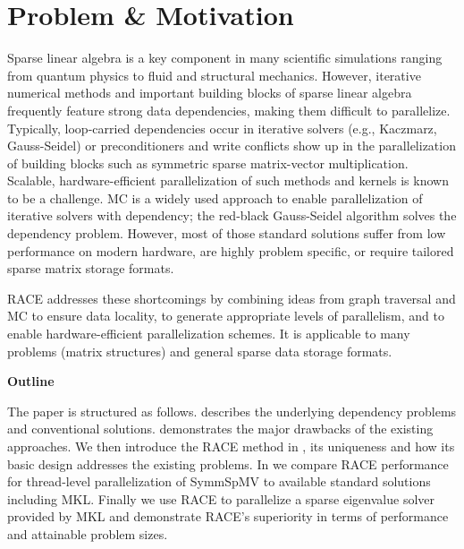 	
\section{Problem \& Motivation}
	Sparse linear algebra is a key component in many scientific simulations
	ranging from quantum physics to fluid and structural mechanics.
	However, iterative numerical methods  
	and important building blocks of sparse linear algebra frequently feature strong 
	data dependencies, making them difficult to parallelize.
	Typically, loop-carried dependencies occur in
	iterative solvers  (e.g., Kaczmarz, Gauss-Seidel) or preconditioners 
	and write conflicts show up in the parallelization of building blocks such 
	as symmetric sparse matrix-vector multiplication.
	Scalable, hardware-efficient parallelization of such methods and kernels is known to be a 
	challenge. \Acrlong{MC} is a widely used approach to enable parallelization
	of iterative solvers with \DK dependency; \eg the 
	red-black Gauss-Seidel algorithm solves the \DONE dependency problem.
	However, most of those standard solutions suffer from low performance
	on modern hardware, are highly problem specific, or require tailored
        sparse matrix storage formats.

	\Acrshort{RACE} addresses these shortcomings by combining ideas from graph traversal
	and \acrlong{MC} to ensure data locality, to generate appropriate levels of parallelism,
	and to enable hardware-efficient parallelization schemes. It is applicable
	to many problems (\ie matrix structures) and general sparse data storage formats.
	

\noindent\textbf{Outline}


\noindent	The paper is structured as follows.  describes
	the underlying dependency problems and conventional
	solutions.  
	demonstrates the major drawbacks of the existing 
	approaches. We then introduce the \acrshort{RACE} method in ,
	its uniqueness and how its basic design addresses the existing problems. 
	In  we compare \acrshort{RACE} performance for thread-level parallelization of \acrfull{SymmSpMV} to
	available standard solutions including \acrshort{MKL}. Finally we use \acrshort{RACE} to parallelize a sparse eigenvalue solver provided by \acrshort{MKL} and demonstrate  \acrshort{RACE}'s superiority in terms of performance and attainable problem sizes. 
		
